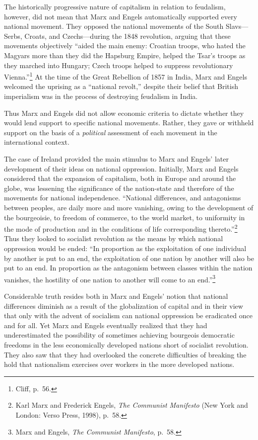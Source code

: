 The historically progressive nature of capitalism in relation to feudalism, however, did not mean that Marx and Engels automatically supported every national movement. They opposed the national movements of the South Slavs---Serbs, Croats, and Czechs---during the 1848 revolution, arguing that these movements objectively ``aided the main enemy: Croatian troops, who hated the Magyars more than they did the Hapsburg Empire, helped the Tsar's troops as they marched into Hungary; Czech troops helped to suppress revolutionary Vienna.''\footnote{Cliff, p.\ 56.} At the time of the Great Rebellion of 1857 in India, Marx and Engels welcomed the uprising as a ``national revolt,'' despite their belief that British imperialism was in the process of destroying feudalism in India.

Thus Marx and Engels did not allow economic criteria to dictate whether they would lend support to specific national movements. Rather, they gave or withheld support on the basis of a \emph{political} assessment of each movement in the international context.

The case of Ireland provided the main stimulus to Marx and Engels' later development of their ideas on national oppression. Initially, Marx and Engels considered that the expansion of capitalism, both in Europe and around the globe, was lessening the significance of the nation-state and therefore of the movements for national independence. ``National differences, and antagonisms between peoples, are daily more and more vanishing, owing to the development of the bourgeoisie, to freedom of commerce, to the world market, to uniformity in the mode of production and in the conditions of life corresponding thereto.''\footnote{Karl Marx and Frederick Engels, \emph{The Communist Manifesto} (New York and London: Verso Press, 1998), p.\ 58.} Thus they looked to socialist revolution as the means by which national oppression would be ended: ``In proportion as the exploitation of one individual by another is put to an end, the exploitation of one nation by another will also be put to an end. In proportion as the antagonism between classes within the nation vanishes, the hostility of one nation to another will come to an end.''\footnote{Marx and Engels, \emph{The Communist Manifesto}, p.\ 58.}

Considerable truth resides both in Marx and Engels' notion that national differences diminish as a result of the globalization of capital and in their view that only with the advent of socialism can national oppression be eradicated once and for all. Yet Marx and Engels eventually realized that they had underestimated the possibility of sometimes achieving bourgeois democratic freedoms in the less economically developed nations short of socialist revolution. They also saw that they had overlooked the concrete difficulties of breaking the hold that nationalism exercises over workers in the more developed nations.

